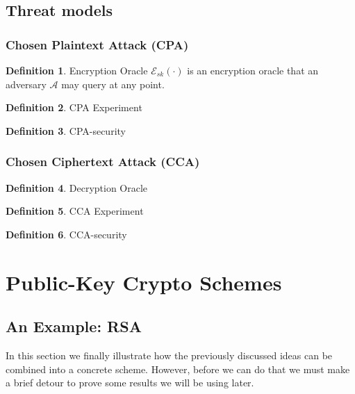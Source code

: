 \documentclass{article}
\theoremstyle{definition}
\newtheorem{definition}{Definition}[section]
\newcommand{\A}{\mathcal{A}}
\begin{document}
\subsection{Threat models}
\subsubsection{Chosen Plaintext Attack (CPA)}
\begin{definition}{Encryption Oracle}
  $\mathcal{E}_{sk}(\cdot)$ is an encryption oracle that an adversary $\A$ may query at
  any point.
\end{definition}
\begin{definition}{CPA Experiment}

\end{definition}
\begin{definition}{CPA-security}
\end{definition}
\subsubsection{Chosen Ciphertext Attack (CCA)}
\begin{definition}{Decryption Oracle}

\end{definition}
\begin{definition}{CCA Experiment}
\end{definition}

\begin{definition}{CCA-security}
\end{definition}
\section{Public-Key Crypto Schemes}
\subsection{An Example: RSA}
In this section we finally illustrate how the previously discussed ideas can be
combined into a concrete scheme. However, before we can do that we must make a
brief detour to prove some results we will be using later.
\end{document}
